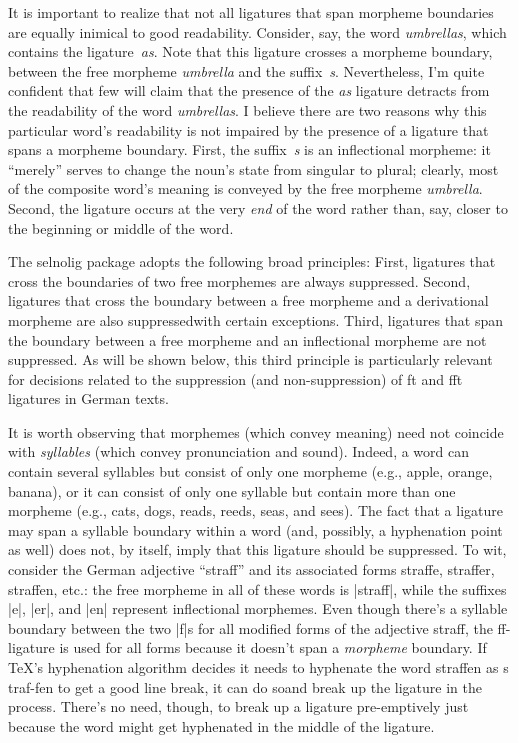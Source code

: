 \documentclass[11pt]{article}
\newcommand{\pkg}[1]{\textsf{#1}}
\begin{document}
It is important to realize that not all ligatures that span morpheme boundaries are equally inimical to good readability. Consider, say, the word \emph{umbrellas}, which contains the ligature~\emph{as}. Note that this ligature crosses a morpheme boundary, between the free morpheme \emph{umbrella} and the suffix~\emph{s}. Nevertheless, I'm quite confident that few will claim that the presence of the \emph{as} ligature detracts from the readability of the word \emph{umbrellas}. I believe there are two reasons why this particular word's readability is not impaired by the presence of a ligature that spans a morpheme boundary. First, the suffix~\emph{s} is an inflectional morpheme: it \enquote{merely} serves to change the noun's state from singular to plural; clearly, most of the composite word's meaning is conveyed by the free morpheme \emph{umbrella}. Second, the ligature occurs at the very \emph{end} of the word rather than, say, closer to the beginning or middle of the word.

The \pkg{selnolig} package adopts the following broad principles: First, ligatures that cross the boundaries of two free morphemes are always suppressed. Second, ligatures that cross the boundary between a free morpheme and a derivational morpheme are also suppressed\textemdash with certain exceptions. Third, ligatures that span the boundary between a free morpheme and an inflectional morpheme are not suppressed. As will be shown below, this third principle is particularly relevant for decisions related to the suppression (and non-suppression) of ft and fft ligatures in German texts.

It is worth observing that morphemes (which convey meaning) need not coincide with \emph{syllables} (which convey pronunciation and sound). Indeed, a word can contain several syllables but consist of only one morpheme (e.g., apple, orange, banana), or it can consist of only one syllable but contain more than one morpheme (e.g., cats, dogs, reads, reeds, seas, and sees). The fact that a ligature may span a syllable boundary within a word (and, possibly, a hyphenation point as well) does not, by itself, imply that this ligature should be suppressed. To wit, consider the German adjective \enquote{straff} and its associated forms straffe, straffer, straffen, etc.: the free morpheme in all of these words is |straff|, while the suffixes |e|, |er|, and |en| represent inflectional morphemes. Even though there's a syllable boundary between the two |f|s for all modified forms of the adjective straff, the ff-ligature is used for all forms because it doesn't span a \emph{morpheme} boundary. If TeX's hyphenation algorithm decides it needs to hyphenate the word straffen as s\kern0pt traf-fen to get a good line break, it can do so\textemdash and break up the ligature in the process. There's no need, though, to break up a ligature pre-emptively just because the word might get hyphenated in the middle of the ligature.
\end{document}
